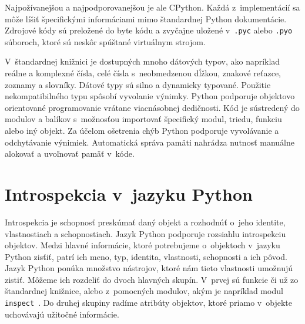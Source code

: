 \documentclass[11pt,oneside,final]{fithesis2}
\begin{document}
Najpožívanejšou a najpodporovanejšou je ale CPython. Každá z~implementácií sa môže líšiť špecifickými informáciami mimo štandardnej Python dokumentácie.
Zdrojové kódy sú preložené do byte kódu a zvyčajne uložené v~\texttt{.pyc} alebo \texttt{.pyo} súboroch, ktoré sú neskôr spúštané virtuálnym strojom.

	V~štandardnej knižnici je dostupných mnoho dátových typov, ako napríklad reálne a komplexné čísla, celé čísla s~neobmedzenou dĺžkou, znakové reťazce, zoznamy a slovníky. Dátové typy sú silno a dynamicky typované. Použitie nekompatibilného typu spôsobí vyvolanie výnimky. Python podporuje objektovo orientované programovanie vrátane viacnásobnej dedičnosti. Kód je sústredený do modulov a balíkov s~možnosťou importovať špecifický modul, triedu, funkciu alebo iný objekt. Za účelom ošetrenia chýb Python podporuje vyvolávanie a odchytávanie výnimiek. Automatická správa pamäti nahrádza nutnosť manuálne alokovať a uvoľnovať pamäť v~kóde.~\cite{pythonintro}


	\section{Introspekcia v~jazyku Python}
		Introspekcia je schopnosť preskúmať daný objekt a rozhodnúť o~jeho identite, vlastnostiach a schopnostiach. Jazyk Python podporuje rozsiahlu introspekciu objektov. Medzi hlavné informácie, ktoré potrebujeme o~objektoch v~jazyku Python zisťiť, patrí ich meno, typ, identita, vlastnosti, schopnosti a ich pôvod. Jazyk Python ponúka množstvo nástrojov, ktoré nám tieto vlastnosti umožnujú zistiť. Môžeme ich rozdeliť do dvoch hlavných skupín. V~prvej sú funkcie či už zo štandardnej knižnice, alebo z~pomocných modulov, akým je napríklad modul \texttt{inspect}~\cite{inspectmodule}. Do druhej skupiny radíme atribúty objektov, ktoré priamo v~objekte uchovávajú užitočné informácie.
		
\end{document}
